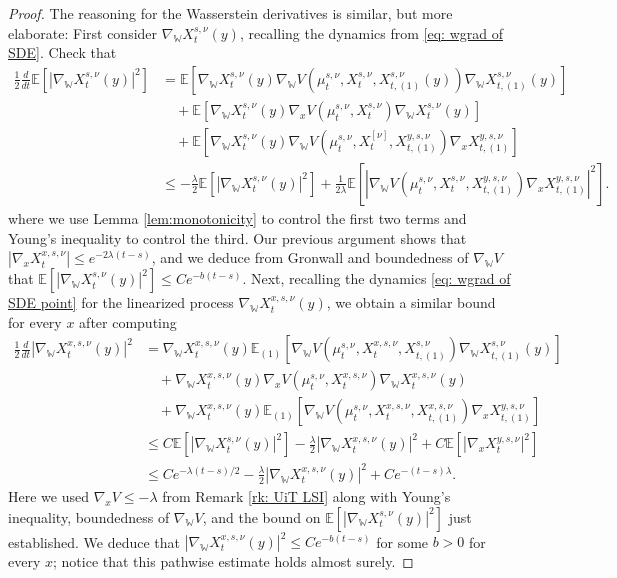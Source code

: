 \documentclass[11pt,reqno]{amsart}
\numberwithin{equation}{section}
\theoremstyle{definition}
\def\E{{\mathbb E}}
\newcommand{\wgrad}{\nabla_{\W}}
\newcommand{\W}{\mathbb W}
\begin{document}
\begin{proof}
   The reasoning for the Wasserstein derivatives is similar, but more elaborate: First consider $\wgrad X_t^{s,\nu}(y)$, recalling the dynamics from \eqref{eq: wgrad of SDE}. Check that 
     \begin{align*}
     \frac 12 \frac{d}{dt}\E[|\wgrad X_t^{s,\nu}(y)|^2]&=\E[ \wgrad X_t^{s,\nu}(y)\wgrad V(\mu^{s,\nu}_t,X_t^{s,\nu}, X_{t,(1)}^{s,\nu}(y))\wgrad  X_{t,(1)}^{s,\nu}(y)]\ \\
     &\quad +\E[\wgrad X_t^{s,\nu}(y) \nabla_xV(\mu^{s,\nu}_t,X_t^{s,\nu})\wgrad X_t^{s,\nu}(y)] \\
     &\quad +\E[\wgrad X_t^{s,\nu}(y) \wgrad V(\mu_t^{s,\nu},X_t^{[\nu]}, X_{t,(1)}^{y,s,\nu})\nabla_x X_{t,(1)}^{y,s,\nu}] \\
        &\leq -\frac\lambda 2 \E[|\wgrad X_t^{s,\nu}(y)|^2] +\frac{1}{2\lambda}\E[|\wgrad V(\mu_t^{s,\nu},X_t^{s,\nu}, X_{t,(1)}^{y,s,\nu})\nabla_x X_{t,(1)}^{y,s,\nu}|^2] .
    \end{align*}
    where we use Lemma \ref{lem:monotonicity} to control the first two terms and  Young's inequality to control the third. Our previous argument shows that $|\nabla_x X_t^{x,s,\nu}| \le e^{-2\lambda (t-s)}$, and we deduce from Gronwall and boundedness of $\wgrad V$ that $\E[|\wgrad X_t^{s,\nu}(y)|^2]\leq C e^{-b(t-s)}$. 
    Next, recalling the dynamics \eqref{eq: wgrad of SDE point} for the linearized process $\wgrad X_t^{x,s,\nu}(y)$, we obtain a similar bound for every $x$ after computing
    \begin{align*}
        \frac12 \frac{d}{dt}|\wgrad X_t^{x,s,\nu}(y)|^2&= \wgrad X_t^{x,s,\nu}(y) \E_{(1)}[\wgrad V(\mu_t^{s,\nu},X_t^{x,s,\nu}, X_{t,(1)}^{s,\nu}) \wgrad X_{t,(1)}^{s,\nu}(y)] \\
        &\quad + \wgrad X_t^{x,s,\nu}(y)\nabla_x V(\mu_t^{s,\nu},X_t^{x,s,\nu}) \wgrad X_t^{x,s,\nu}(y) \\
        &\quad + \wgrad X_t^{x,s,\nu}(y) \E_{(1)}[\wgrad V(\mu_t^{s,\nu},X_t^{x,s,\nu}, X_{t,(1)}^{x,s,\nu})\nabla_x X_{t,(1)}^{y,s,\nu}] \\
        &\leq C\E[|\wgrad X_t^{s,\nu}(y)|^2] -\frac{\lambda}{2}|\wgrad X_t^{x,s,\nu}(y)|^2 +C\E[|\nabla_x X_t^{y,s,\nu}|^2] \\ 
        &\leq Ce^{-\lambda(t-s)/2}-\frac{\lambda}{2}|\wgrad X_t^{x,s,\nu}(y)|^2+Ce^{-(t-s) \lambda} .
    \end{align*}
    Here we used $\nabla_x V \le -\lambda$ from Remark \ref{rk: UiT LSI} along with  Young's inequality, boundedness of $\wgrad V$, and the bound on $\E[|\wgrad X_t^{s,\nu}(y)|^2]$ just established. We deduce that   $|\wgrad X_t^{x,s,\nu}(y)|^2\leq Ce^{-b(t-s)}$ for some $b>0$ for every $x$; notice that this pathwise estimate holds almost surely.
    

\end{proof}
\end{document}
